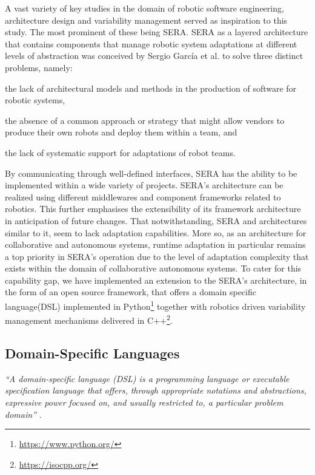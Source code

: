 \documentclass[conference]{IEEEtran}
\newcommand{\foot}[1]{\footnote{\url{#1}}}
\begin{document}
A vast variety of key studies in the domain of robotic software engineering, architecture design and variability management served as inspiration to this study. The most prominent of these being SERA. SERA as a layered architecture that contains components that manage robotic system adaptations at different levels of abstraction was conceived by Sergio Garc\'{i}a et al. \cite{sera} to solve three distinct problems, namely:
\begin{enumerate*}[label=(\roman*)]
	\item the lack of architectural models and methods in the production of software for robotic systems,
	\item the absence of a common approach or strategy that might allow vendors to produce their own robots and deploy them within a team, and
	\item the lack of systematic support for adaptations of robot teams.
\end{enumerate*}

By communicating through well-defined interfaces, SERA has the ability to be implemented within a wide variety of projects. SERA's architecture can be realized using different middlewares and component frameworks related to robotics. This further emphasises the extensibility of its framework architecture in anticipation of future changes.
That notwithstanding, SERA and architectures similar to it, seem to lack adaptation capabilities. More so, as an architecture for collaborative and autonomous systems, runtime adaptation in particular remains a top priority in SERA's operation due to the level of adaptation complexity that exists within the domain of collaborative autonomous systems. To cater for this capability gap, we have implemented an extension to the SERA's architecture, in the form of an open source framework, that offers a domain specific language(DSL) implemented in Python\foot{https://www.python.org/} together with robotics driven variability management mechanisms delivered in C++\foot{https://isocpp.org/}.

\subsection{Domain-Specific Languages}
\textit{``A domain-specific language (DSL) is a programming language or executable specification language that offers, through appropriate notations and abstractions, expressive power focused on, and usually restricted to, a particular problem domain''} \cite{dsl}.
\end{document}
